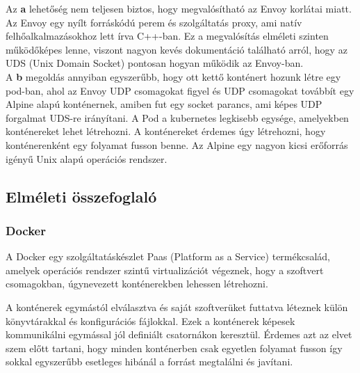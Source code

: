 \documentclass[a4paper,oneside]{article}
\begin{document}
Az \textbf{a} lehetőség nem teljesen biztos, hogy megvalósítható az Envoy korlátai
miatt. Az Envoy egy nyílt forráskódú perem és szolgáltatás proxy, ami natív felhőalkalmazásokhoz
lett írva C++-ban. Ez a megvalósítás elméleti szinten működőképes lenne,
viszont nagyon kevés dokumentáció található arról, hogy az UDS (Unix Domain Socket)
pontosan hogyan működik az Envoy-ban. \\
A \textbf{b} megoldás annyiban egyszerűbb, hogy ott kettő konténert hozunk létre egy pod-ban, ahol
az Envoy UDP csomagokat figyel és UDP csomagokat továbbít egy Alpine alapú konténernek, amiben fut egy
socket parancs, ami képes UDP forgalmat UDS-re irányítani. A Pod a kubernetes legkisebb egysége,
amelyekben konténereket lehet létrehozni. A konténereket érdemes úgy létrehozni, hogy
konténerenként egy folyamat fusson benne. Az Alpine egy nagyon kicsi erőforrás igényű Unix alapú
operációs rendszer.


\subsection{Elméleti összefoglaló}
\subsubsection{Docker}
A Docker egy szolgáltatáskészlet Paas (Platform as a Service) termékcsalád,
amelyek operációs rendszer szintű virtualizációt végeznek, hogy a szoftvert
csomagokban, úgynevezett konténerekben lehessen létrehozni.

A konténerek egymástól elválasztva és saját szoftverüket futtatva léteznek
külön könyvtárakkal és konfigurációs fájlokkal. Ezek a konténerek képesek
kommunikálni egymással jól definiált csatornákon keresztül. Érdemes azt az
elvet szem előtt tartani, hogy minden konténerben csak egyetlen folyamat fusson
így sokkal egyszerűbb esetleges hibánál a forrást megtalálni és javítani.
\end{document}
